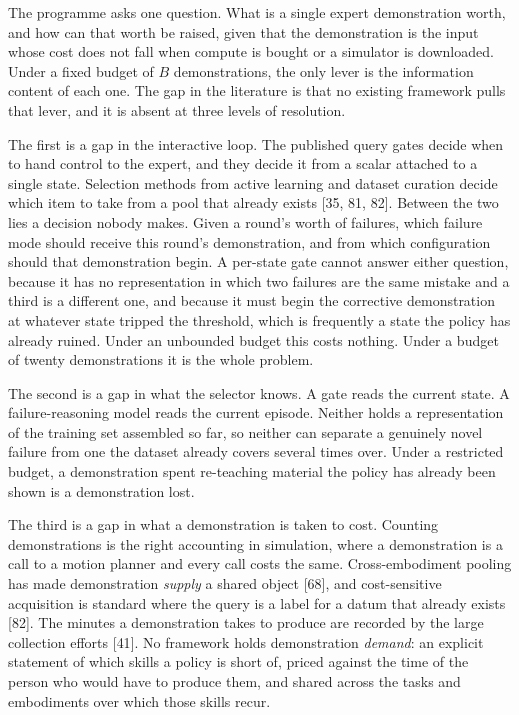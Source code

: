 \documentclass[
  11pt,
]{article}
\begin{document}
The programme asks one question. What is a single expert demonstration
worth, and how can that worth be raised, given that the demonstration is
the input whose cost does not fall when compute is bought or a simulator
is downloaded. Under a fixed budget of \(B\) demonstrations, the only
lever is the information content of each one. The gap in the literature
is that no existing framework pulls that lever, and it is absent at
three levels of resolution.

The first is a gap in the interactive loop. The published query gates
decide when to hand control to the expert, and they decide it from a
scalar attached to a single state. Selection methods from active
learning and dataset curation decide which item to take from a pool that
already exists {[}35, 81, 82{]}. Between the two lies a decision nobody
makes. Given a round's worth of failures, which failure mode should
receive this round's demonstration, and from which configuration should
that demonstration begin. A per-state gate cannot answer either
question, because it has no representation in which two failures are the
same mistake and a third is a different one, and because it must begin
the corrective demonstration at whatever state tripped the threshold,
which is frequently a state the policy has already ruined. Under an
unbounded budget this costs nothing. Under a budget of twenty
demonstrations it is the whole problem.

The second is a gap in what the selector knows. A gate reads the current
state. A failure-reasoning model reads the current episode. Neither
holds a representation of the training set assembled so far, so neither
can separate a genuinely novel failure from one the dataset already
covers several times over. Under a restricted budget, a demonstration
spent re-teaching material the policy has already been shown is a
demonstration lost.

The third is a gap in what a demonstration is taken to cost. Counting
demonstrations is the right accounting in simulation, where a
demonstration is a call to a motion planner and every call costs the
same. Cross-embodiment pooling has made demonstration \emph{supply} a
shared object {[}68{]}, and cost-sensitive acquisition is standard where
the query is a label for a datum that already exists {[}82{]}. The
minutes a demonstration takes to produce are recorded by the large
collection efforts {[}41{]}. No framework holds demonstration
\emph{demand}: an explicit statement of which skills a policy is short
of, priced against the time of the person who would have to produce
them, and shared across the tasks and embodiments over which those
skills recur.
\end{document}
